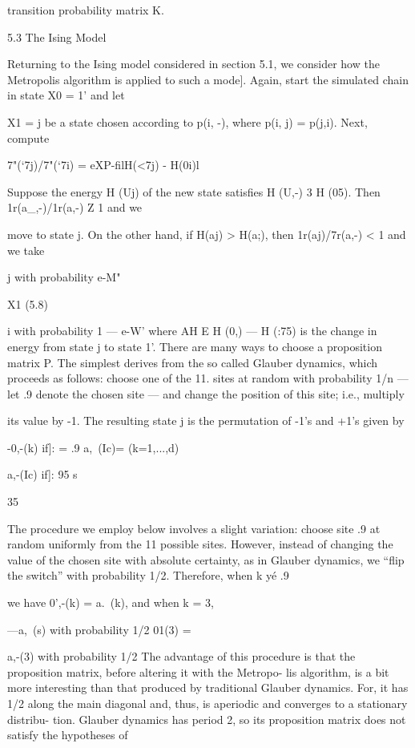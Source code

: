 {transition probability matrix K.

5.3 The Ising Model

Returning to the Ising model considered in section 5.1, we consider how the Metropolis
algorithm is applied to such a mode]. Again, start the simulated chain in state X0 = 1' and let

X1 = j be a state chosen according to p(i, -), where p(i, j) = p(j,i). Next, compute

7"(‘7j)/7"(‘7i) = eXP{-ﬁlH(<7j) - H(0i)l}

Suppose the energy H (Uj) of the new state satisﬁes H (U,-) 3 H (05). Then 1r(a_,-)/1r(a,-) Z 1 and we

move to state j. On the other hand, if H(aj) > H(a;), then 1r(aj)/7r(a,-) < 1 and we take

j with probability e-M"

X1 (5.8)

i with probability 1 — e-W’
where AH E H (0,) — H (:75) is the change in energy from state j to state 1'.
There are many ways to choose a proposition matrix P. The simplest derives from the
so called Glauber dynamics, which proceeds as follows: choose one of the 11. sites at random with
probability 1/n — let .9 denote the chosen site — and change the position of this site; i.e., multiply

its value by -1. The resulting state j is the permutation of -1’s and +1’s given by

-0,-(k) if]: = .9
a,~(Ic)= (k=1,...,d)

a,-(Ic) if]: 95 s

35

The procedure we employ below involves a slight variation: choose site .9 at random uniformly
from the 11 possible sites. However, instead of changing the value of the chosen site with absolute
certainty, as in Glauber dynamics, we “ﬂip the switch” with probability 1/2. Therefore, when k yé .9

we have 0',-(k) = a.~(k), and when k = 3,

—a,~(s) with probability 1/2
01(3) =

a,-(3) with probability 1/2
The advantage of this procedure is that the proposition matrix, before altering it with the Metropo-
lis algorithm, is a bit more interesting than that produced by traditional Glauber dynamics. For,
it has 1/2 along the main diagonal and, thus, is aperiodic and converges to a stationary distribu-
tion. Glauber dynamics has period 2, so its proposition matrix does not satisfy the hypotheses of

}
